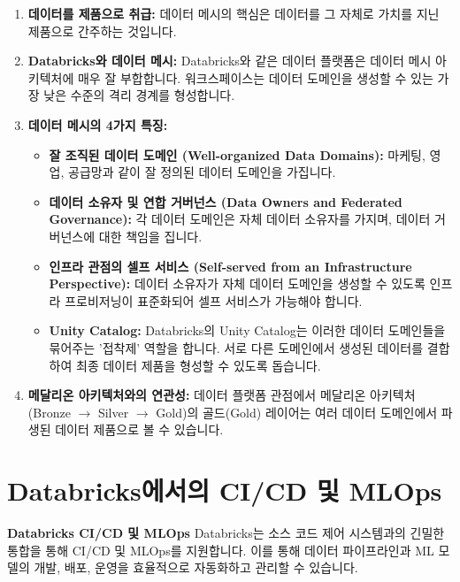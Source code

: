 \documentclass[11pt,a4paper]{article}
\theoremstyle{definition}
\begin{document}
\begin{enumerate}
    \item \textbf{데이터를 제품으로 취급:}
    데이터 메시의 핵심은 데이터를 그 자체로 가치를 지닌 제품으로 간주하는 것입니다.

    \item \textbf{Databricks와 데이터 메시:}
    Databricks와 같은 데이터 플랫폼은 데이터 메시 아키텍처에 매우 잘 부합합니다. 워크스페이스는 데이터 도메인을 생성할 수 있는 가장 낮은 수준의 격리 경계를 형성합니다.

    \item \textbf{데이터 메시의 4가지 특징:}
    \begin{itemize}
        \item \textbf{잘 조직된 데이터 도메인 (Well-organized Data Domains):} 마케팅, 영업, 공급망과 같이 잘 정의된 데이터 도메인을 가집니다.
        \item \textbf{데이터 소유자 및 연합 거버넌스 (Data Owners and Federated Governance):} 각 데이터 도메인은 자체 데이터 소유자를 가지며, 데이터 거버넌스에 대한 책임을 집니다.
        \item \textbf{인프라 관점의 셀프 서비스 (Self-served from an Infrastructure Perspective):} 데이터 소유자가 자체 데이터 도메인을 생성할 수 있도록 인프라 프로비저닝이 표준화되어 셀프 서비스가 가능해야 합니다.
        \item \textbf{Unity Catalog:} Databricks의 Unity Catalog는 이러한 데이터 도메인들을 묶어주는 '접착제' 역할을 합니다. 서로 다른 도메인에서 생성된 데이터를 결합하여 최종 데이터 제품을 형성할 수 있도록 돕습니다.
    \end{itemize}

    \item \textbf{메달리온 아키텍처와의 연관성:}
    데이터 플랫폼 관점에서 메달리온 아키텍처(Bronze $\rightarrow$ Silver $\rightarrow$ Gold)의 골드(Gold) 레이어는 여러 데이터 도메인에서 파생된 데이터 제품으로 볼 수 있습니다.
\end{enumerate}

\newpage
\section{Databricks에서의 CI/CD 및 MLOps}

\begin{tcolorbox}[conceptbox] %
\textbf{Databricks CI/CD 및 MLOps}
Databricks는 소스 코드 제어 시스템과의 긴밀한 통합을 통해 CI/CD 및 MLOps를 지원합니다. 이를 통해 데이터 파이프라인과 ML 모델의 개발, 배포, 운영을 효율적으로 자동화하고 관리할 수 있습니다.
\end{tcolorbox}
\end{document}
